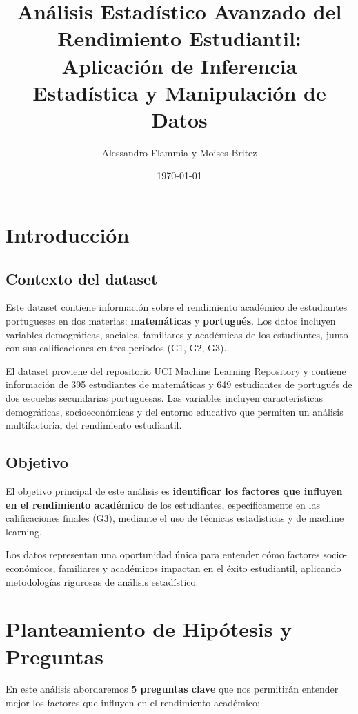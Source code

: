 \documentclass[a4paper,12pt]{article}
\title{Análisis Estadístico Avanzado del Rendimiento Estudiantil: \\
Aplicación de Inferencia Estadística y Manipulación de Datos}
\author{Alessandro Flammia y Moises Britez}
\date{\today}
\begin{document}
\maketitle

\section{Introducción}

\subsection{Contexto del dataset}

Este dataset contiene información sobre el rendimiento académico de estudiantes portugueses en dos materias: \textbf{matemáticas} y \textbf{portugués}. Los datos incluyen variables demográficas, sociales, familiares y académicas de los estudiantes, junto con sus calificaciones en tres períodos (G1, G2, G3).

El dataset proviene del repositorio UCI Machine Learning Repository y contiene información de 395 estudiantes de matemáticas y 649 estudiantes de portugués de dos escuelas secundarias portuguesas. Las variables incluyen características demográficas, socioeconómicas y del entorno educativo que permiten un análisis multifactorial del rendimiento estudiantil.

\subsection{Objetivo}

El objetivo principal de este análisis es \textbf{identificar los factores que influyen en el rendimiento académico} de los estudiantes, específicamente en las calificaciones finales (G3), mediante el uso de técnicas estadísticas y de machine learning.

Los datos representan una oportunidad única para entender cómo factores socio-económicos, familiares y académicos impactan en el éxito estudiantil, aplicando metodologías rigurosas de análisis estadístico.

\section{Planteamiento de Hipótesis y Preguntas}

En este análisis abordaremos \textbf{5 preguntas clave} que nos permitirán entender mejor los factores que influyen en el rendimiento académico:
\end{document}
